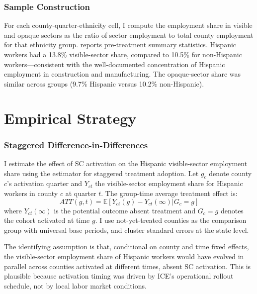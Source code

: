 \documentclass[12pt]{article}
\newcommand{\E}{\mathbb{E}}
\begin{document}
\subsubsection*{Sample Construction} For each county-quarter-ethnicity cell, I compute the employment share in visible and opaque sectors as the ratio of sector employment to total county employment for that ethnicity group.  reports pre-treatment summary statistics. Hispanic workers had a 13.8\% visible-sector share, compared to 10.5\% for non-Hispanic workers---consistent with the well-documented concentration of Hispanic employment in construction and manufacturing. The opaque-sector share was similar across groups (9.7\% Hispanic versus 10.2\% non-Hispanic).




\section{Empirical Strategy}
\label{sec:strategy}

\subsubsection*{Staggered Difference-in-Differences} I estimate the effect of SC activation on the Hispanic visible-sector employment share using the \citet{callaway2021difference} estimator for staggered treatment adoption. Let $g_c$ denote county $c$'s activation quarter and $Y_{ct}$ the visible-sector employment share for Hispanic workers in county $c$ at quarter $t$. The group-time average treatment effect is:
\begin{equation}
    ATT(g, t) = \E[Y_{ct}(g) - Y_{ct}(\infty) | G_c = g]
\end{equation}
where $Y_{ct}(\infty)$ is the potential outcome absent treatment and $G_c = g$ denotes the cohort activated at time $g$. I use not-yet-treated counties as the comparison group with universal base periods, and cluster standard errors at the state level.

The identifying assumption is that, conditional on county and time fixed effects, the visible-sector employment share of Hispanic workers would have evolved in parallel across counties activated at different times, absent SC activation. This is plausible because activation timing was driven by ICE's operational rollout schedule, not by local labor market conditions.
\end{document}
